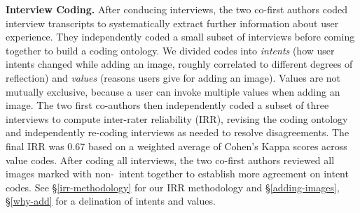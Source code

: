 \textbf{Interview Coding.}
After conducing interviews, the two co-first authors coded interview transcripts to systematically extract further information about user experience. 
They independently coded a small subset of interviews before coming together to build a coding ontology. 
We divided codes into \textit{intents} (how user intents changed while adding an image, roughly correlated to different degrees of reflection) and \textit{values} (reasons users give for adding an image). 
Values are not mutually exclusive, because a user can invoke multiple values when adding an image.
The two first co-authors then independently coded a subset of three interviews to compute inter-rater reliability (IRR), revising the coding ontology and independently re-coding interviews as needed to resolve disagreements. 
The final IRR was 0.67 based on a weighted average of Cohen's Kappa scores across value codes. 
After coding all interviews, the two co-first authors reviewed all images marked with non-\direct~intent together to establish more agreement on intent codes.
See \S\ref{irr-methodology} for our IRR methodology and \S\ref{adding-images}, \S\ref{why-add} for a delination of intents and values.





